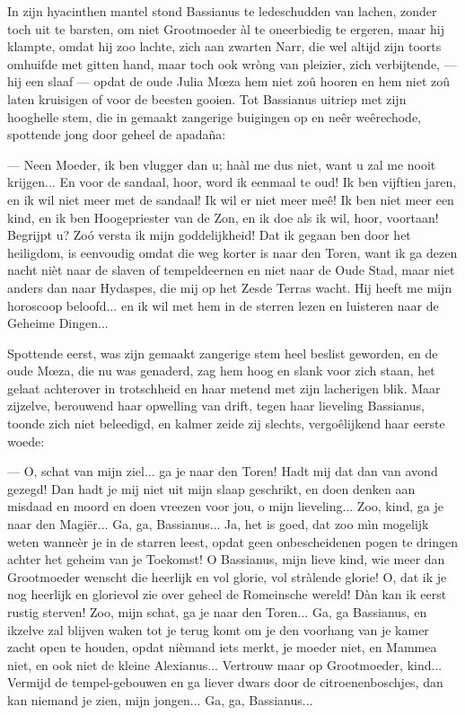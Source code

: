 \documentclass[a4paper, 12pt, oneside, dutch]{article}
\begin{document}
In zijn hyacinthen mantel stond Bassianus te ledeschudden van lachen, zonder toch uit te barsten, om niet Grootmoeder àl te oneerbiedig te ergeren, maar hij klampte, omdat hij zoo lachte, zich aan zwarten Narr, die wel altijd zijn toorts omhuifde met gitten hand, maar toch ook wròng van pleizier, zich verbijtende, --- hij een slaaf --- opdat de oude Julia Mœza hem niet zoû hooren en hem niet zoû laten kruisigen of voor de beesten gooien. Tot Bassianus uitriep met zijn hooghelle stem, die in gemaakt zangerige buigingen op en neêr weêrechode, spottende jong door geheel de apadaña:

--- Neen Moeder, ik ben vlugger dan u; haàl me dus niet, want u zal me nooit krijgen... En voor de sandaal, hoor, word ik eenmaal te oud! Ik ben vijftien jaren, en ik wil niet meer met de sandaal! Ik wil er niet meer meê! Ik ben niet meer een kind, en ik ben Hoogepriester van de Zon, en ik doe als ik wil, hoor, voortaan! Begrijpt u? Zoó versta ik mijn goddelijkheid! Dat ik gegaan ben door het heiligdom, is eenvoudig omdat die weg korter is naar den Toren, want ik ga dezen nacht nièt naar de slaven of tempeldeernen en niet naar de Oude Stad, maar niet anders dan naar Hydaspes, die mij op het Zesde Terras wacht. Hij heeft me mijn horoscoop beloofd... en ik wil met hem in de sterren lezen en luisteren naar de Geheime Dingen...

Spottende eerst, was zijn gemaakt zangerige stem heel beslist geworden, en de oude Mœza, die nu was genaderd, zag hem hoog en slank voor zich staan, het gelaat achterover in trotschheid en haar metend met zijn lacherigen blik. Maar zijzelve, berouwend haar opwelling van drift, tegen haar lieveling Bassianus, toonde zich niet beleedigd, en kalmer zeide zij slechts, vergoêlijkend haar eerste woede:

--- O, schat van mijn ziel... ga je naar den Toren! Hadt mij dat dan van avond gezegd! Dan hadt je mij niet uit mijn slaap geschrikt, en doen denken aan misdaad en moord en doen vreezen voor jou, o mijn lieveling... Zoo, kind, ga je naar den Magiër... Ga, ga, Bassianus... Ja, het is goed, dat zoo mìn mogelijk weten wanneèr je in de starren leest, opdat geen onbescheidenen pogen te dringen achter het geheim van je Toekomst! O Bassianus, mijn lieve kind, wie meer dan Grootmoeder wenscht die heerlijk en vol glorie, vol stràlende glorie! O, dat ik je nog heerlijk en glorievol zie over geheel de Romeinsche wereld! Dàn kan ik eerst rustig sterven! Zoo, mijn schat, ga je naar den Toren... Ga, ga Bassianus, en ikzelve zal blijven waken tot je terug komt om je den voorhang van je kamer zacht open te houden, opdat nièmand iets merkt, je moeder niet, en Mammea niet, en ook niet de kleine Alexianus... Vertrouw maar op Grootmoeder, kind... Vermijd de tempel-gebouwen en ga liever dwars door de citroenenboschjes, dan kan niemand je zien, mijn jongen... Ga, ga, Bassianus...
\end{document}
